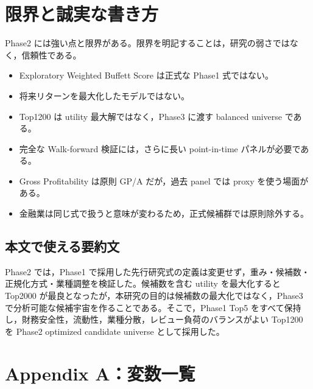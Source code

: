 \documentclass[a4paper,10pt]{article}
\newcommand{\1}{\mathbf{1}}
\begin{document}
\section{限界と誠実な書き方}

Phase2 には強い点と限界がある。限界を明記することは，研究の弱さではなく，信頼性である。

\begin{warningbox}
\begin{itemize}[leftmargin=2em]
\item Exploratory Weighted Buffett Score は正式な Phase1 式ではない。
\item 将来リターンを最大化したモデルではない。
\item Top1200 は utility 最大解ではなく，Phase3 に渡す balanced universe である。
\item 完全な Walk-forward 検証には，さらに長い point-in-time パネルが必要である。
\item Gross Profitability は原則 GP/A だが，過去 panel では proxy を使う場面がある。
\item 金融業は同じ式で扱うと意味が変わるため，正式候補群では原則除外する。
\end{itemize}
\end{warningbox}

\subsection{本文で使える要約文}
\begin{keybox}
Phase2 では，Phase1 で採用した先行研究式の定義は変更せず，重み・候補数・正規化方式・業種調整を検証した。候補数を含む utility を最大化すると Top2000 が最良となったが，本研究の目的は候補数の最大化ではなく，Phase3 で分析可能な候補宇宙を作ることである。そこで，Phase1 Top5 をすべて保持し，財務安全性，流動性，業種分散，レビュー負荷のバランスがよい Top1200 を Phase2 optimized candidate universe として採用した。
\end{keybox}

\section{Appendix A：変数一覧}
\end{document}
